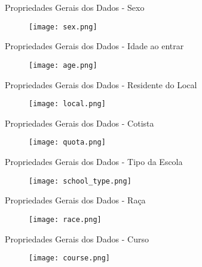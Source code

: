 \begin{frame}{Propriedades Gerais dos Dados - Sexo}
    \begin{figure}[!ht]
        \centering
        \texttt{[image: sex.png]}
    \end{figure}
\end{frame}

\begin{frame}{Propriedades Gerais dos Dados - Idade ao entrar}
    \begin{figure}[!ht]
        \centering
        \texttt{[image: age.png]}
    \end{figure}
\end{frame}

\begin{frame}{Propriedades Gerais dos Dados - Residente do Local}
    \begin{figure}[!ht]
        \centering
        \texttt{[image: local.png]}
    \end{figure}
\end{frame}

\begin{frame}{Propriedades Gerais dos Dados - Cotista}
    \begin{figure}[!ht]
        \centering
        \texttt{[image: quota.png]}
    \end{figure}
\end{frame}

\begin{frame}{Propriedades Gerais dos Dados - Tipo da Escola}
    \begin{figure}[!ht]
        \centering
        \texttt{[image: school\_type.png]}
    \end{figure}
\end{frame}

\begin{frame}{Propriedades Gerais dos Dados - Raça}
    \begin{figure}[!ht]
        \centering
        \texttt{[image: race.png]}
    \end{figure}
\end{frame}

\begin{frame}{Propriedades Gerais dos Dados - Curso}
    \begin{figure}[!ht]
        \centering
        \texttt{[image: course.png]}
    \end{figure}
\end{frame}

